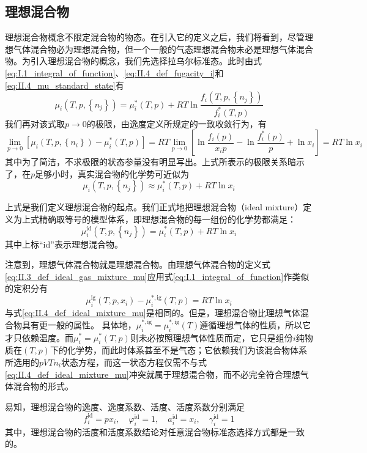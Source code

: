 \documentclass[main.tex]{subfiles}
\begin{document}
\subsection{理想混合物}
理想混合物概念不限定混合物的物态。在引入它的定义之后，我们将看到，尽管理想气体混合物必为理想混合物，但一个一般的气态理想混合物未必是理想气体混合物。为引入理想混合物的概念，我们先选择拉乌尔标准态。此时由式\eqref{eq:I.1_integral_of_function}、\eqref{eq:II.4_def_fugacity_i}和\eqref{eq:II.4_mu_standard_state}有
\[\mu_i\left(T,p,\left\{n_j\right\}\right)=\mu_i^*\left(T,p\right)+RT\ln\frac{f_i\left(T,p,\left\{n_j\right\}\right)}{f_i^*\left(T,p\right)}\]
我们再对该式取$p\rightarrow 0$的极限，由逸度定义所规定的一致收敛行为，有
\[\lim_{p\to 0}\left[\mu_i\left(T,p,\left\{n_i\right\}\right)-\mu_i^*\left(T,p\right)\right]=RT\lim_{p\to 0}\left[\ln\frac{f_i\left(p\right)}{x_ip}-\ln\frac{f_i^*\left(p\right)}{p}+\ln x_i\right]=RT\ln x_i\]
其中为了简洁，不求极限的状态参量没有明显写出。上式所表示的极限关系暗示了，在$p$足够小时，真实混合物的化学势可近似为
\[\mu_i\left(T,p,\left\{n_j\right\}\right)\approx\mu_i^*\left(T,p\right)+RT\ln x_i\]

上式是我们定义理想混合物的起点。我们正式地把理想混合物（ideal mixture）定义为上式精确取等号的模型体系，即理想混合物的每一组份的化学势都满足：
\begin{equation}\label{eq:II.4_def_ideal_mixture_mu}
    \mu_i^\text{id}\left(T,p,\left\{n_j\right\}\right)=\mu_i^*\left(T,p\right)+RT\ln x_i
\end{equation}
其中上标“id”表示理想混合物。

注意到，理想气体混合物就是理想混合物。由理想气体混合物的定义式\eqref{eq:II.3_def_ideal_gas_mixture_mu}应用式\eqref{eq:I.1_integral_of_function}作类似的定积分有
\[\mu_i^\text{ig}\left(T,p,x_i\right)-\mu_i^{*,\text{ig}}\left(T,p\right)=RT\ln x_i\]
与式\eqref{eq:II.4_def_ideal_mixture_mu}是相同的。但是，理想混合物比理想气体混合物具有更一般的属性。 具体地，$\mu_i^{*,\text{ig}}=\mu_i^{*,\text{ig}}\left(T\right)$遵循理想气体的性质，所以它才只依赖温度。而$\mu_i^*=\mu_i^*\left(T,p\right)$则未必按照理想气体性质而定，它只是组份$i$纯物质在$\left(T,p\right)$下的化学势，而此时体系甚至不是气态；它依赖我们为该混合物体系所选用的$pVTn_i$状态方程，而这一状态方程仅需不与式\eqref{eq:II.4_def_ideal_mixture_mu}冲突就属于理想混合物，而不必完全符合理想气体混合物的形式。

易知，理想混合物的逸度、逸度系数、活度、活度系数分别满足
\[f_i^\text{id}=px_i,\quad\varphi_i^\text{id}=1,\quad a_i^\text{id}=x_i,\quad\gamma_i^\text{id}=1\]
其中，理想混合物的活度和活度系数结论对任意混合物标准态选择方式都是一致的。
\end{document}
